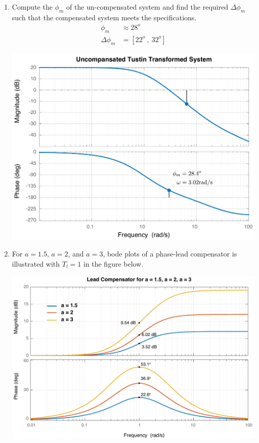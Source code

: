 \documentclass[twoside]{article}
\begin{document}
\begin{enumerate}
\item Compute the $\phi_m$ of the un-compensated system 
and find the required $\Delta \phi_m$ such that the 
compensated system meets the specifications.
%
\begin{align*}
  \phi_m &\approx 28^o
\\ 
  \Delta \phi_m &= [ 22^o \ , \ 32^o]
\end{align*}
%
     \begin{center}
 \begin{minipage}[h]{\linewidth}
     \begin{center}
       \includegraphics[width=\textwidth]{uncomp}
     \end{center}
 \end{minipage}
     \end{center}
%
\item For $a = 1.5$, $a = 2$, and $a = 3$, bode plots
of a phase-lead compensator is illustrated with $T_{l} = 1$
in the figure below.  
%
     \begin{center}
 \begin{minipage}[h]{\linewidth}
     \begin{center}
       \includegraphics[width=\textwidth]{lead}

\end{center}
\end{minipage}
\end{center}
\end{enumerate}
\end{document}
